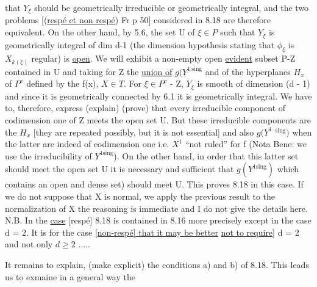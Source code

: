 
that $Y_{\xi}$ should be geometrically irreducible or geometrically
integral, and the two problems [(\uline{respé et non respé}) Fr p 50]
considered in 8.18 are therefore equivalent. On the other hand,
by 5.6, the set U of $\xi \in P$ such that $Y_{\xi}$ is geometrically integral
of dim d-1 (the dimension hypothesis stating that $\phi_{\xi}$ is $X_{k(\xi)}$
regular) is \uline{open}. We will exhibit a non-empty open \uline{evident} subset
P-Z contained in U and taking for Z the \uline{union of} $g(\underline{Y}^{1\ \mathrm{sing}}$ and of
the hyperplanes $H_{x}$ of $P^{v}$ defined by the f(x), $X \in T$. For $\xi \in P^{v}$ -
Z, $Y_{\xi}$ is smooth of dimension
(d - 1) and since it is geometrically connected by 6.1 it is
geometrically integral. We have to, therefore, express (explain)
(prove) that every irreducible component of codimension one of Z
meets the open set U. But these irreducible components are the $H_{x}$
[they are repeated possibly, but it is not essential] and also $g(Y^{1}$
$^{\mathrm{sing}})$ when the latter are indeed of codimension one i.e. $X^{1}$ ``not
ruled'' for f (Nota Bene: we use the irreducibility of $Y^{1\mathrm{sing}}$). On
the other hand, in order that this latter set should meet the open
set U it is necessary and sufficient that $g(Y^{1\mathrm{sing}})$ which contains
an open and dense set) should meet U. This proves 8.18 in this
case. If we do not suppose that X is normal, we apply the
previous result to the normalization of X the reasoning is
immediate and I do not give the details here. N.B. In the \uline{case}
[respé] 8.18 is contained in 8.16 more precisely except in the
case d = 2. It is for the case \uline{[non-respé] that it may be better}
\uline{not to require]} d = 2 and not only $d \geq 2$ .....

It remains to explain, (make explicit) the conditions a) and
b) of 8.18. This leads us to exmaine in a general way the
